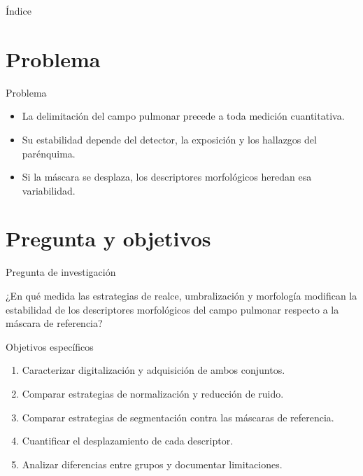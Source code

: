 \documentclass[12pt]{beamer}
\title[\acronimoTrabajo]{\tituloTrabajo}
\subtitle{\cursoNombre}
\author[\cursoNombre]{\autorA \\ \autorB}
\institute[]{\carrera\\Docente: \docente}
\date{\fechaEntrega}
\begin{document}
\begin{frame}[plain]
    \titlepage
\end{frame}

\begin{frame}{Índice}
    \tableofcontents
\end{frame}

\section{Problema}
\begin{frame}{Problema}
    \begin{itemize}
        \item La delimitación del campo pulmonar precede a toda medición cuantitativa.
        \item Su estabilidad depende del detector, la exposición y los hallazgos del parénquima.
        \item Si la máscara se desplaza, los descriptores morfológicos heredan esa variabilidad.
    \end{itemize}
\end{frame}

\section{Pregunta y objetivos}
\begin{frame}{Pregunta de investigación}
    \begin{block}{}
        ¿En qué medida las estrategias de realce, umbralización y morfología
        modifican la estabilidad de los descriptores morfológicos del campo
        pulmonar respecto a la máscara de referencia?
    \end{block}
\end{frame}

\begin{frame}{Objetivos específicos}
    \begin{enumerate}
        \item Caracterizar digitalización y adquisición de ambos conjuntos.
        \item Comparar estrategias de normalización y reducción de ruido.
        \item Comparar estrategias de segmentación contra las máscaras de referencia.
        \item Cuantificar el desplazamiento de cada descriptor.
        \item Analizar diferencias entre grupos y documentar limitaciones.
    \end{enumerate}
\end{frame}
\end{document}
